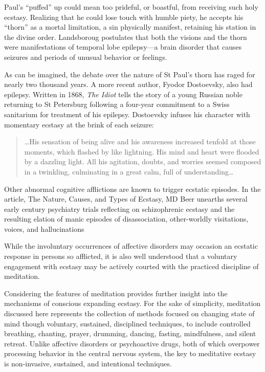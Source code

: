 \documentclass{UIdahoMastersThesis}
\begin{document}
Paul's ``puffed'' up could mean too prideful, or boastful, from receiving such holy ecstasy. Realizing that he could lose touch with humble piety, he accepts his ``thorn'' as a mortal limitation, a sin physically manifest, retaining his station in the divine order. Landsboroug postulates that both the visions and the thorn were manifestations of temporal lobe epilepsy---a brain disorder that causes seizures and periods of unusual behavior or feelings.

As can be imagined, the debate over the nature of St Paul's thorn has raged for nearly two thousand years. A more recent author, Fyodor Dostoevsky, also had epilepsy. Written in 1868, \emph{The Idiot} tells the story of a young Russian noble returning to St Petersburg following a four-year commitment to a Swiss sanitarium for treatment of his epilepsy. Dostoevsky infuses his character with momentary ecstasy at the brink of each seizure:

\begin{quote}
{\ldots His sensation of being alive and his awareness increased tenfold at those moments, which flashed by like lightning. His mind and heart were flooded by a dazzling light. All his agitation, doubts, and worries seemed composed in a twinkling, culminating in a great calm, full of understanding\ldots}\cite{bible_new_1984}
\end{quote}

Other abnormal cognitive afflictions are known to trigger ecstatic episodes. In the article, The Nature, Causes, and Types of Ecstasy, MD Beer unearths several early  century psychiatry trials reflecting on schizophrenic ecstasy and the resulting elation of manic episodes of disassociation, other-worldly visitations, voices, and hallucinations \cite{beer_nature_2000}

While the involuntary occurrences of affective disorders may occasion an ecstatic response in persons so afflicted, it is also well understood that a voluntary engagement with ecstasy may be actively courted with the practiced discipline of meditation.

Considering the features of meditation provides further insight into the mechanisms of conscious expanding ecstasy. For the sake of simplicity, meditation discussed here represents the collection of methods focused on changing state of mind though voluntary, sustained, disciplined techniques, to include controlled breathing, chanting, prayer, drumming, dancing, fasting, mindfulness, and silent retreat. Unlike affective disorders or psychoactive drugs, both of which overpower processing behavior in the central nervous system, the key to meditative ecstasy is non-invasive, sustained, and intentional techniques.
\end{document}

